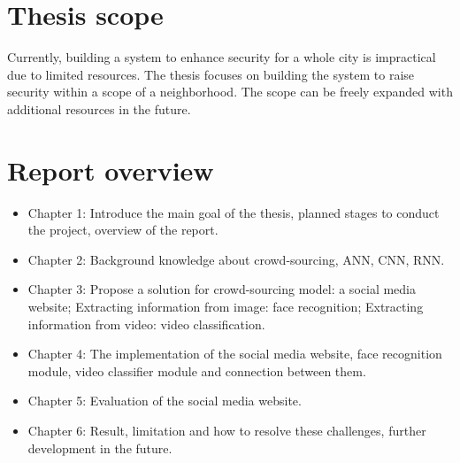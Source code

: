 \section{Thesis scope}
Currently, building a system to enhance security for a whole city is impractical due to limited resources. The thesis focuses on building the system to raise security within a scope of a neighborhood. The scope can be freely expanded with additional resources in the future.
\section{Report overview}
\begin{itemize}
	\item Chapter 1: Introduce the main goal of the thesis, planned stages to conduct the project, overview of the report.
	\item Chapter 2: Background knowledge about crowd-sourcing, ANN, CNN, RNN.
	\item Chapter 3: Propose a solution for crowd-sourcing model: a social media website; Extracting information from image: face recognition; Extracting information from video: video classification.
	\item Chapter 4: The implementation of the social media website, face recognition module, video classifier module and connection between them.
	\item Chapter 5: Evaluation of the social media website.
	\item Chapter 6: Result, limitation and how to resolve these challenges, further development in the future.
\end{itemize} 
